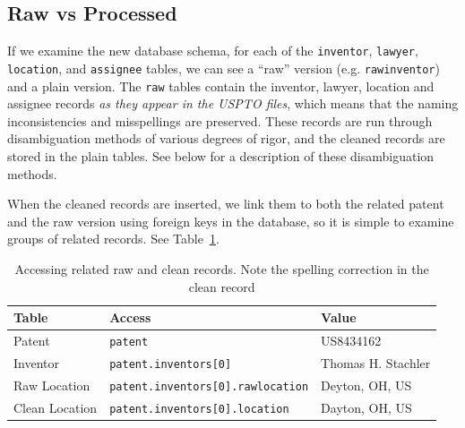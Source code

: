 \subsection{Raw vs Processed}

If we examine the new database schema, for each of the \verb`inventor`,
\verb`lawyer`, \verb`location`, and \verb`assignee` tables, we
can see a ``raw'' version (e.g. \verb`rawinventor`) and a plain
version. The \verb`raw` tables contain the inventor, lawyer, location
and assignee records \emph{as they appear in the USPTO files}, which
means that the naming inconsistencies and misspellings are preserved.
These records are run through disambiguation methods of various degrees
of rigor, and the cleaned records are stored in the plain tables.
See below for a description of these disambiguation methods.

When the cleaned records are inserted, we link them to both the related
patent and the raw version using foreign keys in the database, so
it is simple to examine groups of related records. See Table~\ref{table:rawclean}.

\begin{table}
\center %
\begin{tabular}{|l|l|l|}
\hline 
Table  & Access  & Value \tabularnewline
\hline 
Patent  & \verb`patent`  & US8434162 \tabularnewline
Inventor  & \verb`patent.inventors[0]`  & Thomas H. Stachler \tabularnewline
Raw Location  & \verb`patent.inventors[0].rawlocation`  & Deyton, OH, US \tabularnewline
Clean Location  & \verb`patent.inventors[0].location`  & Dayton, OH, US \tabularnewline
\hline 
\end{tabular}\caption{Accessing related raw and clean records. Note the spelling correction
in the clean record}


\label{table:rawclean} 
\end{table}


